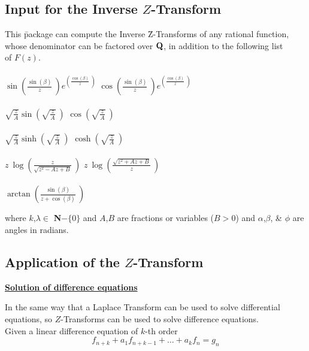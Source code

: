 \subsection[Input for the Inverse Z-Transform]{Input for the Inverse $Z$-Transform}
\begin{tabbing}
  This \= package can compute the Inverse \= Z-Transforms of any 
  rational function, \\ whose denominator can be factored over 
  ${\bf Q}$, in addition to the following list \\ of $F(z)$.\\ \\

\> $\sin \left(\frac{\sin (\beta)}{z} \ \right) 
    e^{\left(\frac{\cos (\beta)}{z} \ \right)}$
\> $\cos \left(\frac{\sin (\beta)}{z} \ \right) 
    e^{\left(\frac{\cos (\beta)}{z} \ \right)}$ \\ \\
\> $\sqrt{\frac{z}{A}} \sin \left( \sqrt{\frac{z}{A}} \ \right)$
\> $\cos \left( \sqrt{\frac{z}{A}} \ \right)$ \\ \\
\> $\sqrt{\frac{z}{A}} \sinh \left( \sqrt{\frac{z}{A}} \ \right)$
\> $\cosh \left( \sqrt{\frac{z}{A}} \ \right)$ \\ \\
\> $z \ \log \left(\frac{z}{\sqrt{z^2-A z+B}} \ \right)$
\> $z \ \log \left(\frac{\sqrt{z^2+A z+B}}{z} \ \right)$ \\ \\
\> $\arctan \left(\frac{\sin (\beta)}{z+\cos (\beta)} \ \right)$
\\
\end{tabbing}

  where $k$,$\lambda \in$ {\bf N}$ -  \{0\}$ and $A$,$B$ are fractions
  or variables ($B>0$) and $\alpha$,$\beta$, \&  $\phi$ are angles 
  in radians.

\subsection[Application of the Z-Transform]{Application of the $Z$-Transform}
\underline {{\bf Solution of difference equations}}

  In the same way that a Laplace Transform can be used to
  solve differential equations, so $Z$-Transforms can be used
  to solve difference equations.\\ 
  Given a linear difference equation of $k$-th order
\begin{equation}
  f_{n+k} + a_1 f_{n+k-1}+ \ldots + a_k f_n = g_n
\label{eq:1}
\end{equation}

